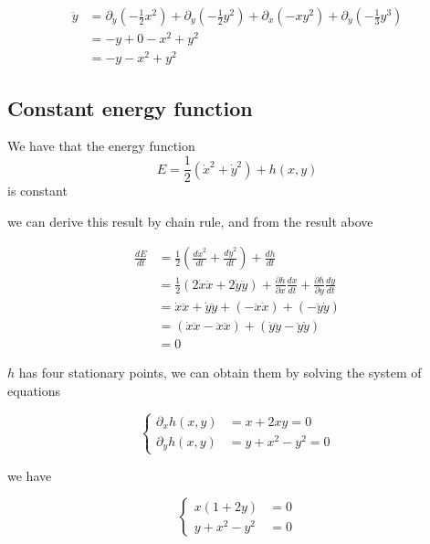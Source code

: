 \documentclass{article}
\begin{document}
	\begin{align*}
		\ddot{y} &= \partial_y\left(-\frac{1}{2}x^2\right) +  \partial_y\left(-\frac{1}{2}y^2\right) + \partial_x(-xy^2)+\partial_y(-\frac{1}{3}y^3) \\
				 &= -y + 0 -x^2 + y^2\\
				 &= -y-x^2+y^2
	\end{align*}

	\subsection*{Constant energy function}
	We have that the energy function
	\[E = \frac{1}{2}(\dot{x}^2 + \dot{y}^2) + h(x,y)\]
	is constant

	we can derive this result by chain rule, and from the result above

	\begin{align*}
		\frac{dE}{dt} &= \frac{1}{2}\left(\frac{d\dot{x}^2}{dt} + \frac{d\dot{y}^2}{dt} \right) + \frac{dh}{dt}\\
					  &= \frac{1}{2}(2\dot{x}\ddot{x} + 2\dot{y}\ddot{y}) + \frac{\partial h}{\partial x}\frac{dx}{dt} + \frac{\partial h}{\partial y}\frac{dy}{dt}\\
					  &= \dot{x}\ddot{x} + \dot{y}\ddot{y} + (-\ddot{x}\dot{x}) + (-\ddot{y}\dot{y}) \\
					  &= (\dot{x}\ddot{x} - \ddot{x}\ddot{x}) + (\dot{y}\ddot{y} - \ddot{y}\dot{y}) \\
					  &= 0
	\end{align*}

$h$ has four stationary points, we can obtain them by solving the system of equations

\begin{equation}
	\begin{cases}
		\partial_x h(x,y) &= x + 2xy = 0 \\
		\partial_y h(x,y) &= y + x^2 - y^2 = 0
	\end{cases}
\end{equation}

we have 

\begin{equation}
	\begin{cases}
		x(1+2y) &= 0 \\
		y + x^2 - y^2 &= 0
	\end{cases}
\end{equation}
\end{document}

